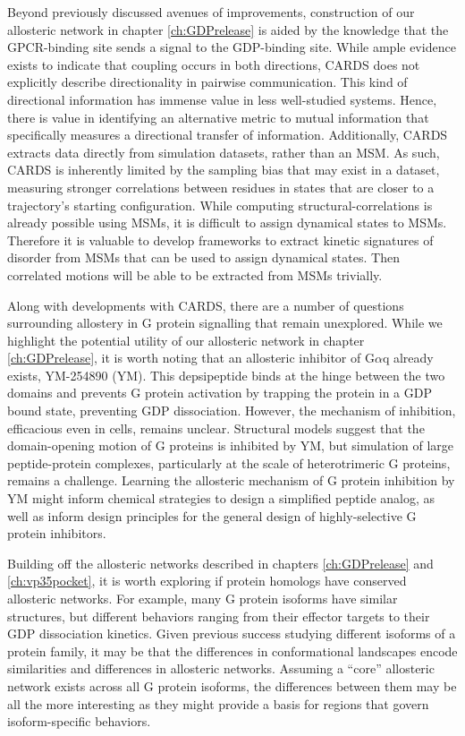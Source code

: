 \documentclass[../main.tex]{subfiles}
\begin{document}
        Beyond previously discussed avenues of improvements, construction of our allosteric network in chapter \ref{ch:GDPrelease} is aided by the knowledge that the GPCR-binding site sends a signal to the GDP-binding site\cite{Oldham:2006ui,Oldham:2008cr,Johnston:2007ir}. While ample evidence exists to indicate that coupling occurs in both directions, CARDS does not explicitly describe directionality in pairwise communication. This kind of directional information has immense value in less well-studied systems. Hence, there is value in identifying an alternative metric to mutual information that specifically measures a directional transfer of information. Additionally, CARDS extracts data directly from simulation datasets, rather than an MSM. As such, CARDS is inherently limited by the sampling bias that may exist in a dataset, measuring stronger correlations between residues in states that are closer to a trajectory’s starting configuration. While computing structural-correlations is already possible using MSMs, it is difficult to assign dynamical states to MSMs. Therefore it is valuable to develop frameworks to extract kinetic signatures of disorder from MSMs that can be used to assign dynamical states. Then correlated motions will be able to be extracted from MSMs trivially.

        Along with developments with CARDS, there are a number of questions surrounding allostery in G protein signalling that remain unexplored. While we highlight the potential utility of our allosteric network in chapter \ref{ch:GDPrelease}, it is worth noting that an allosteric inhibitor of G$\alpha$q already exists, YM-254890 (YM)\cite{Nishimura:2010gt}. This depsipeptide binds at the hinge between the two domains and prevents G protein activation by trapping the protein in a GDP bound state, preventing GDP dissociation. However, the mechanism of inhibition, efficacious even in cells\cite{Onken:2018gz}, remains unclear. Structural models suggest that the domain-opening motion of G proteins is inhibited by YM, but simulation of large peptide-protein complexes, particularly at the scale of heterotrimeric G proteins, remains a challenge. Learning the allosteric mechanism of G protein inhibition by YM might inform chemical strategies to design a simplified peptide analog, as well as inform design principles for the general design of highly-selective G protein inhibitors. 

        Building off the allosteric networks described in chapters \ref{ch:GDPrelease} and \ref{ch:vp35pocket}, it is worth exploring if protein homologs have conserved allosteric networks. For example, many G protein isoforms have similar structures\cite{Flock:2015dj}, but different behaviors ranging from their effector targets to their GDP dissociation kinetics. Given previous success studying different isoforms of a protein family\cite{porter_conformational_2020}, it may be that the differences in conformational landscapes encode similarities and differences in allosteric networks. Assuming a “core” allosteric network exists across all G protein isoforms, the differences between them may be all the more interesting as they might provide a basis for regions that govern isoform-specific behaviors. 
\end{document}
